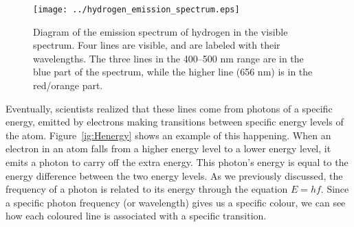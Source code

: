 \begin{figure}[H]
\begin{center}
\texttt{[image: ../hydrogen\_emission\_spectrum.eps]}
\end{center}
\caption{Diagram of the emission spectrum of hydrogen in the visible spectrum.  Four lines are visible, and are labeled with their wavelengths.  The three lines in the 400--500 nm range are in the blue part of the spectrum, while the higher line (656 nm) is in the red/orange part.}
\label{hydrogenspectrum}
\end{figure}

Eventually, scientists realized that these lines come from photons of a specific energy, emitted by electrons making transitions between specific energy levels of the atom.  Figure~\ref{ig:Henergy} shows an example of this happening.  When an electron in an atom falls from a higher energy level to a lower energy level, it emits a photon to carry off the extra energy.  This photon's energy is equal to the energy difference between the two energy levels.  As we previously discussed, the frequency of a photon is related to its energy through the equation $E=hf$.  Since a specific photon frequency (or wavelength) gives us a specific colour, we can see how each coloured line is associated with a specific transition. 
 

